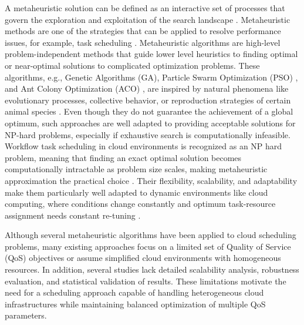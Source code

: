 \documentclass[pdflatex,sn-mathphys-num]{sn-jnl}%
\begin{document}
A metaheuristic solution can be defined as an interactive set of processes that govern the exploration and exploitation of the search landscape \cite{JinchengLoadBalancing, Blum2003}. Metaheuristic methods are one of the strategies that can be applied to resolve performance issues, for example, task scheduling \cite{bib7, Li2018}. Metaheuristic algorithms are high-level problem-independent methods that guide lower level heuristics to finding optimal or near-optimal solutions to complicated optimization problems. These algorithms, e.g., Genetic Algorithms (GA), Particle Swarm Optimization (PSO) \cite{Kennedy1995}, and Ant Colony Optimization (ACO) \cite{Dorigo1992}, are inspired by natural phenomena like evolutionary processes, collective behavior, or reproduction strategies of certain animal species \cite{JinchengLoadBalancing, Yang2010}. Even though they do not guarantee the achievement of a global optimum, such approaches are well adapted to providing acceptable solutions for NP-hard problems, especially if exhaustive search is computationally infeasible. Workflow task scheduling in cloud environments is recognized as an NP hard problem, meaning that finding an exact optimal solution becomes computationally intractable as problem size scales, making metaheuristic approximation the practical choice \cite{Kayalvili2025CloudRA}. Their flexibility, scalability, and adaptability make them particularly well adapted to dynamic environments like cloud computing, where conditions change constantly and optimum task-resource assignment needs constant re-tuning \cite{Buyya2010}.

Although several metaheuristic algorithms have been applied to cloud scheduling problems, many existing approaches focus on a limited set of Quality of Service (QoS) objectives or assume simplified cloud environments with homogeneous resources. In addition, several studies lack detailed scalability analysis, robustness evaluation, and statistical validation of results. These limitations motivate the need for a scheduling approach capable of handling heterogeneous cloud infrastructures while maintaining balanced optimization of multiple QoS parameters.
\end{document}
